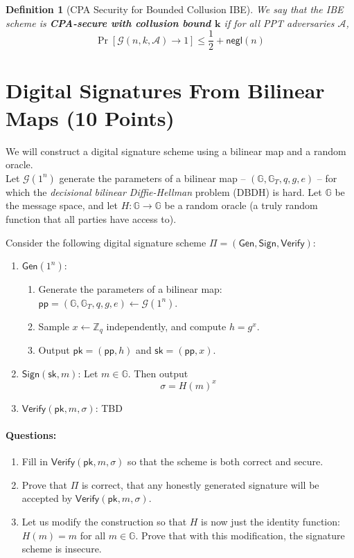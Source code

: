 \documentclass[11pt]{article}
\newtheorem{definition}[theorem]{Definition}
\numberwithin{equation}{section}
\newcommand{\gen}{\mathsf{Gen}}
\newcommand{\sign}{\mathsf{Sign}}
\newcommand{\verify}{\mathsf{Verify}}
\newcommand{\pk}{\mathsf{pk}}
\newcommand{\sk}{\mathsf{sk}}
\newcommand{\params}{\mathsf{pp}}
\newcommand{\A}{\mathcal{A}}
\newcommand{\G}{\mathcal{G}}
\newcommand{\negl}{\mathsf{negl}}
\newcommand{\GG}{\mathbb{G}}
\newcommand{\ZZ}{\mathbb{Z}}
\begin{document}
\begin{definition}[CPA Security for Bounded Collusion IBE]
    We say that the IBE scheme is \textbf{CPA-secure with collusion bound $\mathbf{k}$} if for all PPT adversaries $\A$, 
    \[\Pr[\G(n, k, \A) \to 1] \leq \frac{1}{2} + \negl(n)\]
\end{definition}
\pagebreak


\section{Digital Signatures From Bilinear Maps (10 Points)}
We will construct a digital signature scheme using a bilinear map and a random oracle.\\

Let $\G(1^n)$ generate the parameters of a bilinear map -- $(\GG, \GG_T, q, g, e)$ -- for which the \textit{decisional bilinear Diffie-Hellman} problem (DBDH) is hard. Let $\GG$ be the message space, and let $H: \GG \to \GG$ be a random oracle (a truly random function that all parties have access to).

Consider the following digital signature scheme $\Pi = (\gen, \sign, \verify)$:
\begin{enumerate}
\item $\gen(1^n)$: 
\begin{enumerate}
    \item Generate the parameters of a bilinear map: $\params = (\GG, \GG_T, q, g, e) \leftarrow \G(1^n)$.
    \item Sample $x \leftarrow \ZZ_q$ independently, and compute $h = g^{x}$.
    \item Output $\pk=(\params, h)$ and $\sk = (\params, x)$.
\end{enumerate}

\item $\sign(\sk, m)$: Let $m \in \GG$. Then output 
\[\sigma = H(m)^{x}\]
\item $\verify(\pk, m, \sigma)$: TBD
\end{enumerate}

\paragraph{Questions:}
\begin{enumerate}
    \item Fill in $\verify(\pk, m, \sigma)$ so that the scheme is both correct and secure.
    \item Prove that $\Pi$ is correct, that any honestly generated signature will be accepted by $\verify(\pk, m, \sigma)$.
    \item Let us modify the construction so that $H$ is now just the identity function: $H(m) = m$ for all $m \in \GG$. Prove that with this modification, the signature scheme is insecure.
\end{enumerate}
\end{document}
